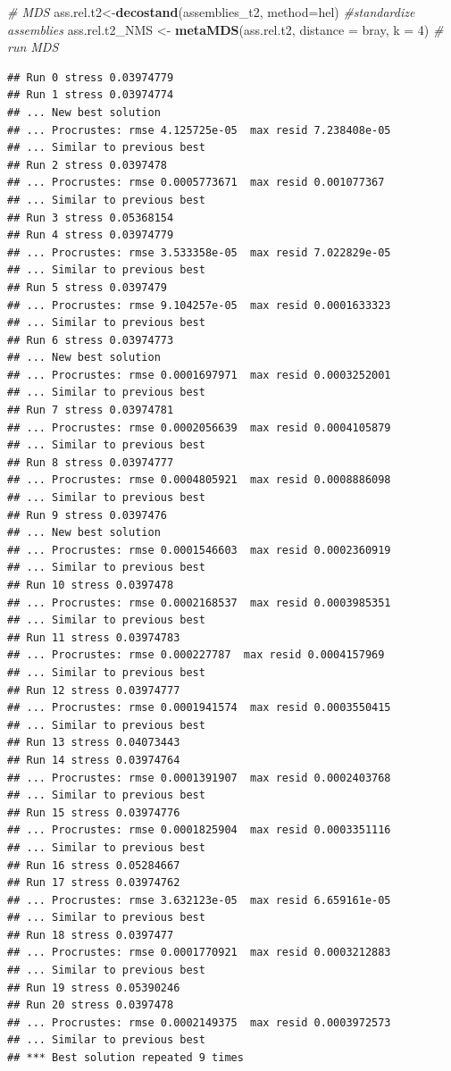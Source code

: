 \documentclass[
]{article}
\newenvironment{Shaded}{\begin{snugshade}}{\end{snugshade}}
\newcommand{\AttributeTok}[1]{\textcolor[rgb]{0.13,0.29,0.53}{#1}}
\newcommand{\CommentTok}[1]{\textcolor[rgb]{0.56,0.35,0.01}{\textit{#1}}}
\newcommand{\DecValTok}[1]{\textcolor[rgb]{0.00,0.00,0.81}{#1}}
\newcommand{\FunctionTok}[1]{\textcolor[rgb]{0.13,0.29,0.53}{\textbf{#1}}}
\newcommand{\NormalTok}[1]{#1}
\newcommand{\OtherTok}[1]{\textcolor[rgb]{0.56,0.35,0.01}{#1}}
\newcommand{\StringTok}[1]{\textcolor[rgb]{0.31,0.60,0.02}{#1}}
\begin{document}
\begin{Shaded}
\begin{Highlighting}[]
\CommentTok{\# MDS }
\NormalTok{ass.rel.t2}\OtherTok{\textless{}{-}}\FunctionTok{decostand}\NormalTok{(assemblies\_t2, }\AttributeTok{method=}\StringTok{\textquotesingle{}hel\textquotesingle{}}\NormalTok{) }\CommentTok{\#standardize assemblies }
\NormalTok{ass.rel.t2\_NMS }\OtherTok{\textless{}{-}} \FunctionTok{metaMDS}\NormalTok{(ass.rel.t2, }\AttributeTok{distance =} \StringTok{\textquotesingle{}bray\textquotesingle{}}\NormalTok{, }\AttributeTok{k =} \DecValTok{4}\NormalTok{) }\CommentTok{\# run MDS }
\end{Highlighting}
\end{Shaded}

\begin{verbatim}
## Run 0 stress 0.03974779 
## Run 1 stress 0.03974774 
## ... New best solution
## ... Procrustes: rmse 4.125725e-05  max resid 7.238408e-05 
## ... Similar to previous best
## Run 2 stress 0.0397478 
## ... Procrustes: rmse 0.0005773671  max resid 0.001077367 
## ... Similar to previous best
## Run 3 stress 0.05368154 
## Run 4 stress 0.03974779 
## ... Procrustes: rmse 3.533358e-05  max resid 7.022829e-05 
## ... Similar to previous best
## Run 5 stress 0.0397479 
## ... Procrustes: rmse 9.104257e-05  max resid 0.0001633323 
## ... Similar to previous best
## Run 6 stress 0.03974773 
## ... New best solution
## ... Procrustes: rmse 0.0001697971  max resid 0.0003252001 
## ... Similar to previous best
## Run 7 stress 0.03974781 
## ... Procrustes: rmse 0.0002056639  max resid 0.0004105879 
## ... Similar to previous best
## Run 8 stress 0.03974777 
## ... Procrustes: rmse 0.0004805921  max resid 0.0008886098 
## ... Similar to previous best
## Run 9 stress 0.0397476 
## ... New best solution
## ... Procrustes: rmse 0.0001546603  max resid 0.0002360919 
## ... Similar to previous best
## Run 10 stress 0.0397478 
## ... Procrustes: rmse 0.0002168537  max resid 0.0003985351 
## ... Similar to previous best
## Run 11 stress 0.03974783 
## ... Procrustes: rmse 0.000227787  max resid 0.0004157969 
## ... Similar to previous best
## Run 12 stress 0.03974777 
## ... Procrustes: rmse 0.0001941574  max resid 0.0003550415 
## ... Similar to previous best
## Run 13 stress 0.04073443 
## Run 14 stress 0.03974764 
## ... Procrustes: rmse 0.0001391907  max resid 0.0002403768 
## ... Similar to previous best
## Run 15 stress 0.03974776 
## ... Procrustes: rmse 0.0001825904  max resid 0.0003351116 
## ... Similar to previous best
## Run 16 stress 0.05284667 
## Run 17 stress 0.03974762 
## ... Procrustes: rmse 3.632123e-05  max resid 6.659161e-05 
## ... Similar to previous best
## Run 18 stress 0.0397477 
## ... Procrustes: rmse 0.0001770921  max resid 0.0003212883 
## ... Similar to previous best
## Run 19 stress 0.05390246 
## Run 20 stress 0.0397478 
## ... Procrustes: rmse 0.0002149375  max resid 0.0003972573 
## ... Similar to previous best
## *** Best solution repeated 9 times
\end{verbatim}
\end{document}
